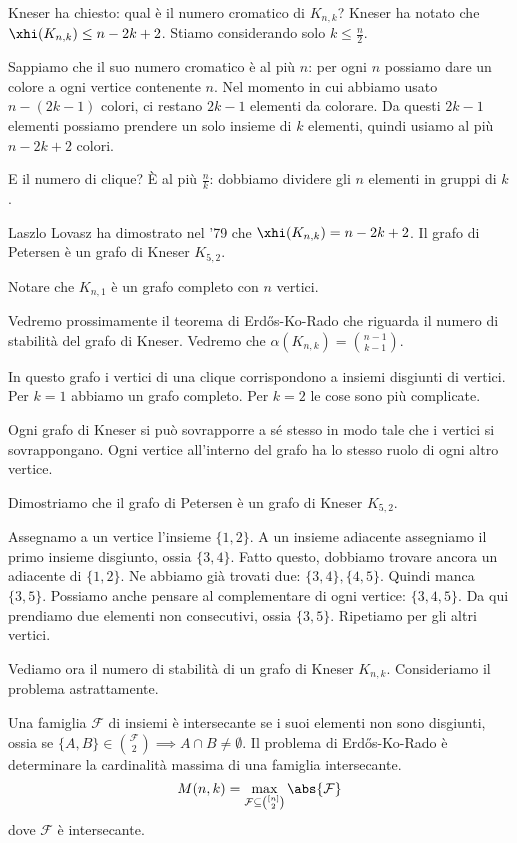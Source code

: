 Kneser ha chiesto: qual \`e il numero cromatico di $K_{n,k}$?
Kneser ha notato che $\xhi(K_{n,k}) \le n - 2k + 2$.
Stiamo considerando solo $k \le \frac{n}{2}$.

Sappiamo che il suo numero cromatico \`e al pi\`u $n$: per ogni $n$ possiamo dare un colore a ogni vertice contenente $n$.
Nel momento in cui abbiamo usato $n - (2k - 1)$ colori, ci restano $2k -1$ elementi da colorare.
Da questi $2k -1$ elementi possiamo prendere un solo insieme di $k$ elementi, quindi usiamo al pi\`u $n - 2k +2$ colori.

E il numero di clique?
\`E al pi\`u $\frac{n}{k}$: dobbiamo dividere gli $n$ elementi in gruppi di $k$.

Laszlo Lovasz ha dimostrato nel '79 che $\xhi(K_{n,k}) = n - 2k +2$.
Il grafo di Petersen \`e un grafo di Kneser $K_{5,2}$.

Notare che $K_{n,1}$ \`e un grafo completo con $n$ vertici.

Vedremo prossimamente il teorema di Erd\H{o}s-Ko-Rado che riguarda il numero di stabilit\`a del grafo di Kneser.
Vedremo che $\alpha (K_{n,k}) = \binom{n-1}{k-1}$.

In questo grafo i vertici di una clique corrispondono a insiemi disgiunti di vertici.
Per $k = 1$ abbiamo un grafo completo.
Per $k = 2$ le cose sono pi\`u complicate.

Ogni grafo di Kneser si pu\`o sovrapporre a s\'e stesso in modo tale che i vertici si sovrappongano.
Ogni vertice all'interno del grafo ha lo stesso ruolo di ogni altro vertice.

Dimostriamo che il grafo di Petersen \`e un grafo di Kneser $K_{5,2}$.

Assegnamo a un vertice l'insieme $\{1,2\}$.
A un insieme adiacente assegniamo il primo insieme disgiunto, ossia $\{3,4\}$.
Fatto questo, dobbiamo trovare ancora un adiacente di $\{1,2\}$.
Ne abbiamo gi\`a trovati due: $\{3,4\}, \{4,5\}$.
Quindi manca $\{3,5\}$.
Possiamo anche pensare al complementare di ogni vertice: $\{3,4,5\}$.
Da qui prendiamo due elementi non consecutivi, ossia $\{3,5\}$.
Ripetiamo per gli altri vertici.


Vediamo ora il numero di stabilit\`a di un grafo di Kneser $K_{n,k}$.
Consideriamo il problema astrattamente.

Una famiglia $\mathcal{F}$ di insiemi \`e intersecante se i suoi elementi non sono disgiunti, ossia se $\{A,B\} \in \binom{\mathcal{F}}{2} \implies A \cap B \neq \emptyset$.
Il problema di Erd\H{o}s-Ko-Rado \`e determinare la cardinalit\`a massima di una famiglia intersecante.
\[
	M(n,k) = \max\limits_{\mathcal{F}\subseteq\binom{[n]}{2}} \abs{\mathcal{F}}
\]
dove $\mathcal{F}$ \`e intersecante.

